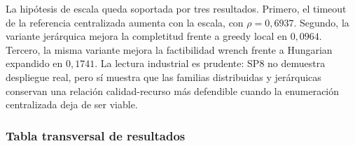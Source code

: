 La hipótesis de escala queda soportada por tres resultados. Primero, el timeout de la
referencia centralizada aumenta con la escala, con $\rho=0{,}6937$. Segundo, la variante
jerárquica mejora la completitud frente a greedy local en $0{,}0964$. Tercero, la misma
variante mejora la factibilidad wrench frente a Hungarian expandido en $0{,}1741$. La
lectura industrial es prudente: SP8 no demuestra despliegue real, pero sí muestra que las
familias distribuidas y jerárquicas conservan una relación calidad-recurso más defendible
cuando la enumeración centralizada deja de ser viable.

\subsubsection{Tabla transversal de resultados}


